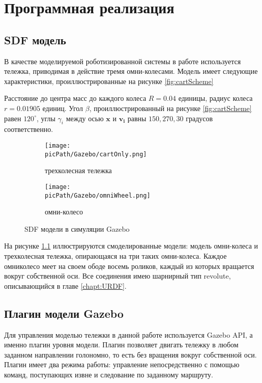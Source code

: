 \documentclass[oneside,final,14pt]{extreport}
\newcommand{\picPath}{img}
\newcommand{\bs}{\boldsymbol}
\begin{document}
\chapter{Программная реализация}
\section{ SDF модель }
\label{chap:SDFCartModel}

В качестве моделируемой роботизированной системы в работе используется тележка, приводимая в действие тремя омни-колесами. 
Модель имеет следующие характеристики, проиллюстрированные на рисунке \ref{fig:cartScheme}
\begin{figure}[H]
\end{figure}

Расстояние до центра масс до каждого колеса $R = 0.04$ единицы, радиус колеса $r = 0.01905$ единиц. Угол $\beta$, проиллюстрированный на рисунке \ref{fig:cartScheme} равен $120^{\circ}$, углы $\gamma_i$ между осью $\bs{x}$ и $\bs{v_i}$ равны $150, 270, 30$ градусов соответственно.


\begin{figure}[H]
  \centering
  \begin{subfigure}[b]{0.4\linewidth}
   \texttt{[image: \\picPath/Gazebo/cartOnly.png]}
    \caption{ трехколесная тележка }
  \end{subfigure}
  \begin{subfigure}[b]{0.4\linewidth}
    \texttt{[image: \\picPath/Gazebo/omniWheel.png]}
    \caption{ омни-колесо}
  \end{subfigure}
  \caption{ SDF модели в симуляции Gazebo}
  \label{Figure:gazeboModels}
\end{figure}

На рисунке \ref{Figure:gazeboModels} иллюстрируются смоделированные модели: модель омни-колеса и трехколесная тележка, опирающаяся на три таких омни-колеса. Каждое омниколесо меет на своем ободе восемь роликов, каждый из которых вращается вокруг собственной оси. Все соединения имею шарнирный тип revolute, описывающийся в главе \ref{chapt:URDF}.
\section{ Плагин модели Gazebo} 
Для управления моделью тележки в данной работе используется Gazebo API, а именно плагин уровня модели. Плагин позволяет двигать тележку в любом заданном направлении голономно, то есть без вращения вокруг собственной оси. Плагин имеет два режима работы: управление непосредственно с помощью команд, поступающих извне и следование по заданному маршруту. 
\end{document}
